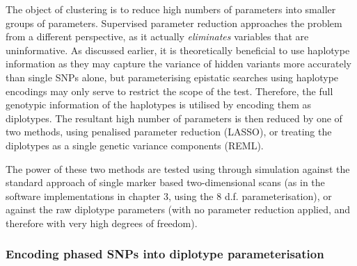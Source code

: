 The object of clustering is to reduce high numbers of parameters into smaller groups of parameters. Supervised parameter reduction approaches the problem from a different perspective, as it actually \emph{eliminates} variables that are uninformative. As discussed earlier, it is theoretically beneficial to use haplotype information as they may capture the variance of hidden variants more accurately than single SNPs alone, but parameterising epistatic searches using haplotype encodings may only serve to restrict the scope of the test. Therefore, the full genotypic information of the haplotypes is utilised by encoding them as diplotypes. The resultant high number of parameters is then reduced by one of two methods, using penalised parameter reduction (LASSO), or treating the diplotypes as a single genetic variance components (REML). 

The power of these two methods are tested using through simulation against the standard approach of single marker based two-dimensional scans (as in the software implementations in chapter 3, using the 8 d.f. parameterisation), or against the raw diplotype parameters (with no parameter reduction applied, and therefore with very high degrees of freedom).

\subsubsection{Encoding phased SNPs into diplotype parameterisation}

